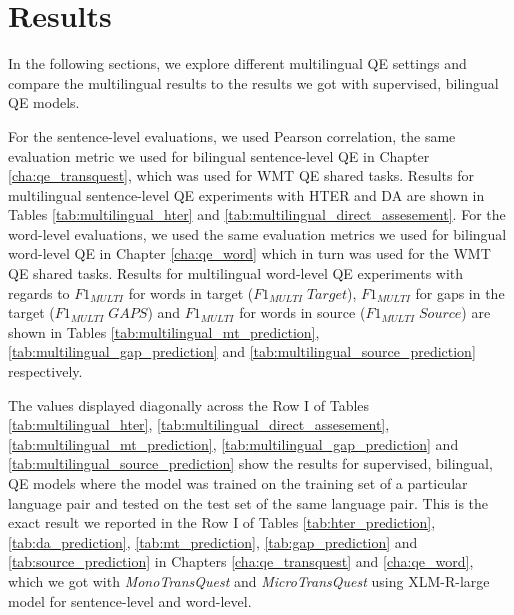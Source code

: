 \section{Results}
\label{sec:multilingual_results}
In the following sections, we explore different multilingual QE settings and compare the multilingual results to the results we got with supervised, bilingual QE models. 

For the sentence-level evaluations, we used Pearson correlation, the same evaluation metric we used for bilingual sentence-level QE in Chapter \ref{cha:qe_transquest}, which was used for WMT QE shared tasks. Results for multilingual sentence-level QE experiments with HTER and DA are shown in Tables \ref{tab:multilingual_hter} and \ref{tab:multilingual_direct_assesement}. For the word-level evaluations, we used the same evaluation metrics we used for bilingual word-level QE in Chapter \ref{cha:qe_word} which in turn was used for the WMT QE shared tasks. Results for multilingual word-level QE experiments with regards to $F1_{\textit{MULTI}}$ for words in target ($F1_{\textit{MULTI}} \; Target$), $F1_{\textit{MULTI}}$ for gaps in the target ($F1_{\textit{MULTI}} \; GAPS$) and $F1_{\textit{MULTI}}$ for words in source ($F1_{\textit{MULTI}} \; Source$) are shown in Tables \ref{tab:multilingual_mt_prediction}, \ref{tab:multilingual_gap_prediction} and \ref{tab:multilingual_source_prediction} respectively. 


The values displayed diagonally across the Row I of Tables  \ref{tab:multilingual_hter}, \ref{tab:multilingual_direct_assesement}, \ref{tab:multilingual_mt_prediction}, \ref{tab:multilingual_gap_prediction} and \ref{tab:multilingual_source_prediction} show the results for supervised, bilingual, QE models where the model was trained on the training set of a particular language pair and tested on the test set of the same language pair. This is the exact result we reported in the Row I of Tables \ref{tab:hter_prediction}, \ref{tab:da_prediction}, \ref{tab:mt_prediction}, \ref{tab:gap_prediction} and \ref{tab:source_prediction} in Chapters \ref{cha:qe_transquest} and \ref{cha:qe_word}, which we got with \textit{MonoTransQuest} and \textit{MicroTransQuest} using  XLM-R-large model \autocite{conneau-etal-2020-unsupervised} for sentence-level and word-level. 

